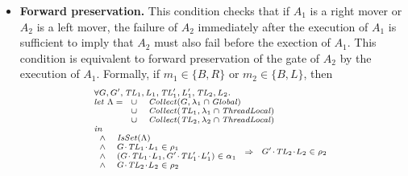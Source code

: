 \begin{itemize}
\item {\bf Forward preservation.}
This condition checks that if $A_1$ is a right mover or $A_2$ is a left mover,
the failure of $A_2$ immediately after the execution of $A_1$ is sufficient to imply 
that $A_2$ must also fail before the exection of $A_1$.
This condition is equivalent to forward preservation of the gate of $A_2$ by the execution of $A_1$.
Formally, if $m_1 \in \{B,R\}$ or $m_2 \in \{B,L\}$, then 
\[
\scriptsize{
\begin{array}{l}
\forall \varsG,\varsG',\varsTL_1,\varsL_1,\varsTL'_1,\varsL'_1,\varsTL_2,\varsL_2. \\
\mathit{let}\ \Lambda =
\begin{array}[t]{ll}
\cup & \Collect(\varsG, \lins_1 \cap \Global) \\
\cup & \Collect(\varsTL_1, \lins_1 \cap \ThreadLocal) \\
\cup & \Collect(\varsTL_2, \lins_2 \cap \ThreadLocal) 
\end{array} \\
\mathit{in} \\
\begin{array}{ll}
\wedge & \IsSet(\Lambda) \\
\wedge & \MakeStore{\varsG}{\varsTL_1}{\varsL_1} \in \rho_1 \\
\wedge & (\MakeStore{\varsG}{\varsTL_1}{\varsL_1},\MakeStore{\varsG'}{\varsTL'_1}{\varsL'_1}) \in \alpha_1 \\
\wedge & \MakeStore{\varsG}{\varsTL_2}{\varsL_2} \in \rho_2 \\
\end{array} 
\Rightarrow 
\begin{array}{l}
\MakeStore{\varsG'}{\varsTL_2}{\varsL_2} \in \rho_2 
\end{array}
\end{array}
}
\]


\end{itemize}
